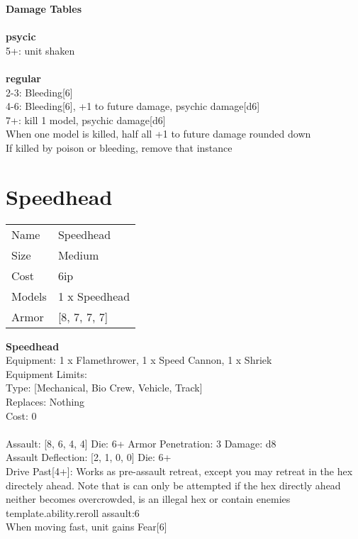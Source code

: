 {\bf Damage Tables} \\
\ \\ {\bf psycic } \\
5+: unit shaken \\
\ \\ {\bf regular } \\
2-3: Bleeding[6] \\
4-6: Bleeding[6], +1 to future damage, psychic damage[d6] \\
7+: kill 1 model, psychic damage[d6] \\
When one model is killed, half all +1 to future damage rounded down \\
If killed by poison or bleeding, remove that instance \\










\pagebreak\pagebreak

\section{ Speedhead }

\begin{tabular}{ll}
  Name & Speedhead \\
  Size & Medium\\
  Cost & 6ip\\
  Models & 1 x Speedhead\\
  Armor & [8, 7, 7, 7]\\
\end{tabular}

\noindent 

{\bf Speedhead } \\
Equipment: 1 x Flamethrower, 1 x Speed Cannon, 1 x Shriek \\
Equipment Limits:  \\
Type: [Mechanical, Bio Crew, Vehicle, Track] \\
Replaces: Nothing \\
Cost: 0\\
\ \\
Assault: [8, 6, 4, 4] Die: 6+ Armor Penetration: 3 Damage: d8 \\
Assault Deflection: [2, 1, 0, 0] Die: 6+\\
\indent Drive Past[4+]: Works as pre-assault retreat, except you may retreat in the hex directely ahead. Note that is can only be attempted if the hex directly ahead neither becomes overcrowded, is an illegal hex or contain enemies\\ 
{template.ability.reroll assault:6}\\ 
When moving fast, unit gains Fear[6]\\ 
 
